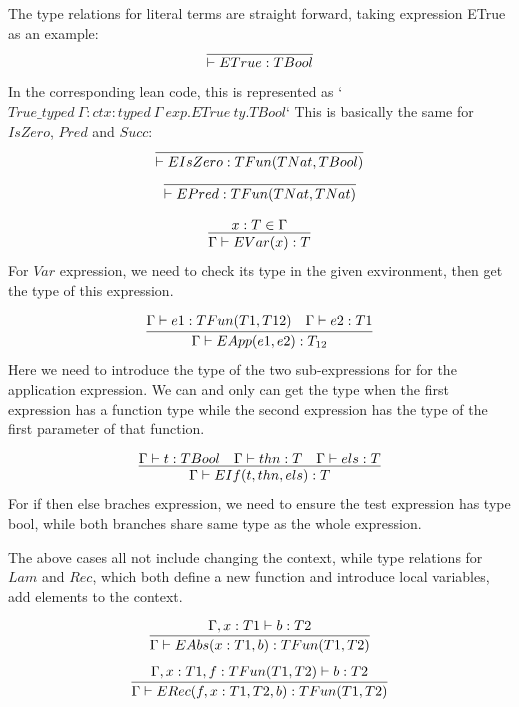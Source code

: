 \documentclass[conference]{IEEEtran}
\begin{document}
The type relations for literal terms are straight forward, taking
expression ETrue as an example:
\begin{equation}
	\infer{\vdash ETrue:TBool}{}
	\label{eq:TITrue}
\end{equation}
In the corresponding lean code, this is represented as
`$True\_typed\ {\Gamma : ctx} : typed\ \Gamma\ exp.ETrue\ ty.TBool$`
This is basically the same for $IsZero$, $Pred$ and $Succ$:
\begin{equation}
	\infer{\vdash EIsZero:TFun(TNat, TBool)}{}
	\label{eq:TIIsZero}
\end{equation}
\begin{equation}
	\infer{\vdash EPred:TFun(TNat, TNat)}{}
	\label{eq:TIPred}
\end{equation}

\begin{equation}
	\infer{\Gamma\vdash EVar(x):T}{x:T\in \Gamma}
	\label{eq:TIVar}
\end{equation}
For $Var$ expression, we need to check its type in the given exvironment,
then get the type of this expression.

\begin{equation}
	\infer{\Gamma\vdash EApp(e1, e2):T_{12}}
	{\Gamma\vdash e1:TFun(T1, T12) & \Gamma\vdash e2:T1}
	\label{eq:TIApp}
\end{equation}
Here we need to introduce the type of the two sub-expressions for
for the application expression. We can and only can get the type
when the first expression has a function type while the second expression
has the type of the first parameter of that function.

\begin{equation}
	\infer{\Gamma\vdash EIf(t, thn, els):T}
	{\Gamma\vdash t:TBool & \Gamma\vdash thn:T & \Gamma\vdash els:T}
	\label{eq:TIIf}
\end{equation}
For if then else braches expression, we need to ensure the test expression has type bool,
while both branches share same type as the whole expression.

The above cases all not include changing the context, while type
relations for $Lam$ and $Rec$, which both define a new function and
introduce local variables, add elements to the context.

\begin{equation}
	\infer{\Gamma\vdash EAbs(x:T1, b):TFun(T1, T2)}
	{\Gamma,x:T1\vdash b:T2}
	\label{eq:TIAbs}
\end{equation}
\begin{equation}
	\infer{\Gamma\vdash ERec(f, x:T1, T2, b):TFun(T1, T2)}
	{\Gamma,x:T1,f:TFun(T1,T2)\vdash b:T2}
	\label{eq:TIRec}
\end{equation}
\end{document}
